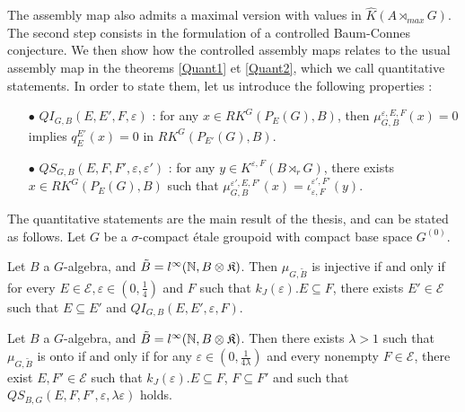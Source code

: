 The assembly map also admits a maximal version with values in $\hat K(A\rtimes_{max} G)$. \\ %

The second step consists in the formulation of a controlled Baum-Connes conjecture. We then show how the controlled assembly maps relates to the usual assembly map in the theorems \ref{Quant1} et \ref{Quant2}, which we call quantitative statements. In order to state them, let us introduce the following properties :\\
\begin{itemize}
\item[$\bullet$] $QI_{G,B}(E,E',F,\varepsilon)$ : for any $x\in RK^G(P_E(G), B )$, then $\mu^{\varepsilon,E,F}_{G,B}(x) = 0$ implies $q_E^{E'}(x)=0$ in $RK^G(P_{E'}(G),B)$.
\item[$\bullet$] $QS_{G,B}(E,F,F',\varepsilon,\varepsilon')$ : for any $y\in K^{\varepsilon,F}(B\rtimes_r G)$, there exists $x\in RK^G(P_E(G),B)$ such that $\mu^{\varepsilon',E,F'}_{G,B}(x)=\iota_{\varepsilon,F}^{\varepsilon',F'}(y)$.\\
\end{itemize} 

The quantitative statements are the main result of the thesis, and can be stated as follows. Let $G$ be a $\sigma$-compact étale groupoid with compact base space $G^{(0)}$.

\begin{thm}
Let $B$ a $G$-algebra, and $\tilde B = l^\infty(\mathbb N,B\otimes \mathfrak K)$. Then $\mu_{G,\tilde B}$ is injective if and only if for every $E\in\mathcal E,\varepsilon\in(0,\frac{1}{4})$ and $F$ such that $k_J(\varepsilon).E\subseteq F$, there exists $E' \in\mathcal E$ such that $E\subseteq E'$ and $QI_{G,B}(E,E',\varepsilon,F)$. 
\end{thm}

\begin{thm}
Let $B$ a $G$-algebra, and $\tilde B = l^\infty(\mathbb N,B\otimes \mathfrak K)$. Then there exists $\lambda>1$ such that $\mu_{G,\tilde B}$ is onto if and only if for any $\varepsilon\in ( 0 ,\frac{1}{4\lambda})$ and every nonempty $F\in\mathcal E$, there exist $E,F'\in\mathcal E$ such that  $k_J(\varepsilon) .E \subseteq F$, $F\subseteq F'$ and such that $QS_{B,G}(E,F,F',\varepsilon,\lambda\varepsilon)$ holds.
\end{thm}

